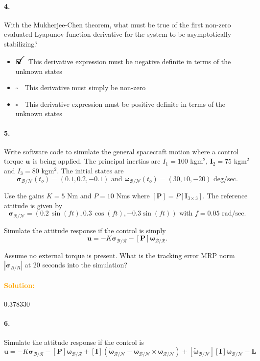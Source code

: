 \documentclass[12pt, a4paper]{article}
\newcommand{\ans}{\item[]$\rlap{\LARGE{\checkmark}}\square\quad$}
\newcommand{\noans}{\item[]$\square\quad$}
\begin{document}
\paragraph{4.}
With the Mukherjee-Chen theorem, what must be true of the first non-zero evaluated Lyapunov function derivative for the system to be asymptotically stabilizing?

\begin{itemize}
\ans This derivative expression must be negative definite in terms of the unknown states
\noans This derivative must simply be non-zero
\noans This derivative expression must be positive definite in terms of the unknown states
\end{itemize}

\paragraph{5.}
Write software code to simulate the general spacecraft motion where a control torque $\bf{u}$ is being applied. The principal inertias are $I_{1} = 100$ kgm$^{2}$, $\bm{I}_{2} = 75$ kgm$^{2}$ and $I_{3} = 80$ kgm$^{2}$. The initial states are
$$\bm{\sigma}_{\mathcal{B}/\mathcal{N}}(t_{o}) = (0.1,0.2,-0.1)\text{ and }\bm{\omega}_{\mathcal{B}/\mathcal{N}}(t_{o}) = (30,10,-20) \text{ deg/sec.}$$

Use the gains $K = 5$ Nm and $P = 10$ Nms where $[\bm{P}] = P [\bm{I}_{3\times3}]$. The reference attitude is given by
$$\bm{\sigma}_{\mathcal{R}/\mathcal{N}} = \left(0.2\,\sin(ft),0.3\,\cos(ft),-0.3\sin(ft)\right)\text{ with }f = 0.05 \text{ rad/sec.}$$

Simulate the attitude response if the control is simply
$$\bm{u} = -K\bm{\sigma}_{\mathcal{B}/\mathcal{R}}-[\bm{P}]\bm{\omega}_{\mathcal{B}/\mathcal{R}}.$$

Assume no external  torque is present. What is the tracking error MRP norm $|\bm{\sigma}_{B/R}|$ at 20 seconds into the simulation?

\paragraph{\textcolor{orange}{Solution:}}0.378330

\paragraph{6.}
Simulate the attitude response if the control is
$$\bm{u} = -K\bm{\sigma}_{\mathcal{B}/\mathcal{R}} - [\bm{P}]\bm{\omega}_{\mathcal{B}/\mathcal{R}} + [\bm{I}](\dot{\bm{\omega}}_{\mathcal{R}/\mathcal{N}} - \bm{\omega}_{\mathcal{B}/\mathcal{N}} \times \bm{\omega}_{\mathcal{R}/\mathcal{N}}) + [\tilde{\bm{\omega}}_{\mathcal{B}/\mathcal{N}}][\bm{I}]\bm{\omega}_{\mathcal{B}/\mathcal{N}} - \bm{L}$$
\end{document}
